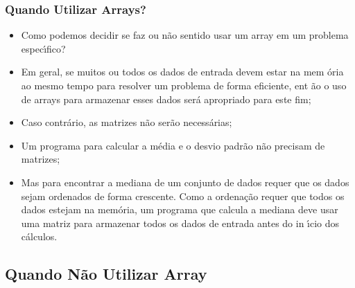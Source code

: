 \documentclass[notes=show]{beamer}
\begin{document}
\begin{frame}%

\frametitle{Quando Utilizar Arrays?}

\begin{itemize}
\item Como podemos decidir se faz ou n\~{a}o sentido usar um array em um
problema espec\'{\i}fico?

\item Em geral, se muitos ou todos os dados de entrada devem estar na mem%
\'{o}ria ao mesmo tempo para resolver um problema de forma eficiente, ent%
\~{a}o o uso de arrays para armazenar esses dados ser\'{a} apropriado para
este fim;

\item Caso contr\'{a}rio, as matrizes n\~{a}o ser\~{a}o necess\'{a}rias;

\item Um programa para calcular a m\'{e}dia e o desvio padr\~{a}o n\~{a}o
precisam de matrizes;

\item Mas para encontrar a mediana de um conjunto de dados requer que os
dados sejam ordenados de forma crescente. Como a ordena\c{c}\~{a}o requer
que todos os dados estejam na mem\'{o}ria, um programa que calcula a mediana
deve usar uma matriz para armazenar todos os dados de entrada antes do in%
\'{\i}cio dos c\'{a}lculos.
\end{itemize}

\transboxout%
\end{frame}%

\subsection{Quando N\~{a}o Utilizar Array}
\end{document}
